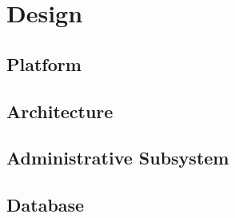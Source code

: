 \chapter{Design}
\label{chap:design}

\section{Platform}
\section{Architecture}
\section{Administrative Subsystem}
\section{Database}
